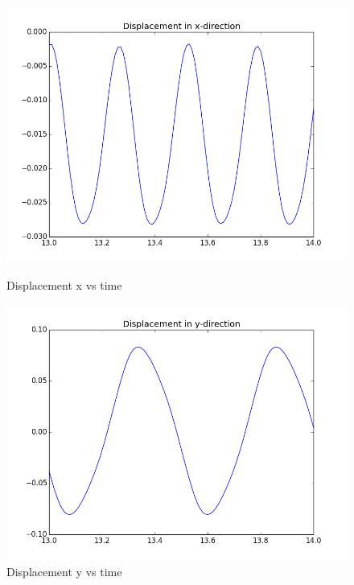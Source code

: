 \begin{figure}[H] 
  \label{FSI2_plots} 
  \begin{minipage}[b]{0.6\linewidth}
    \centering
    \includegraphics[width=0.9\linewidth]{./Verification_Validation/Hron_Turek/FSI2_dis_x.png} 
    \caption{Displacement x vs time} 
    \vspace{4ex}
  \end{minipage}%
  \begin{minipage}[b]{0.6\linewidth}
    \centering
    \includegraphics[width=0.9\linewidth]{./Verification_Validation/Hron_Turek/FSI2_dis_y.png} 
    \caption{Displacement y vs time} 
    \vspace{4ex}
  \end{minipage} 
  \begin{minipage}[b]{0.6\linewidth}
    \centering

\end{minipage}
\end{figure}
